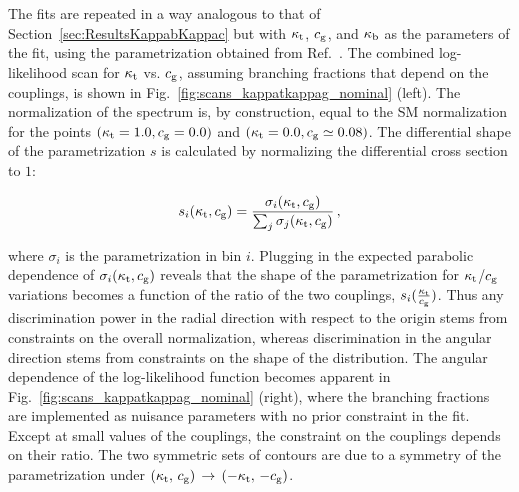 The fits are repeated in a way analogous to that of Section~\ref{sec:ResultsKappabKappac} but with $\kappa_{\mathrm{t}}$, $c_\mathrm{g}$, and $\kappa_{\mathrm{b}}$ as the parameters of the fit, using the parametrization obtained from Ref.~\cite{Grazzini:2017szg}.
% 
The combined log-likelihood scan for $\kappa_{\mathrm{t}}$ vs. $c_\mathrm{g}$, assuming branching fractions that depend on the couplings, is shown in Fig.~\ref{fig:scans_kappatkappag_nominal} (left).
% 
The normalization of the spectrum is, by construction, equal to the SM normalization for the points $( \kappa_{\mathrm{t}} = 1.0, c_\mathrm{g} = 0.0 )$ and $( \kappa_{\mathrm{t}} = 0.0, c_\mathrm{g} \simeq 0.08 )$.
% 
The differential shape of the parametrization $s$ is calculated by normalizing the differential cross section to $1$:
% 
\begin{linenomath*}
\begin{equation}
    s_i(\kappa_{\mathrm{t}}, c_\mathrm{g}) =
        \frac
            {\sigma_i(\kappa_{\mathrm{t}}, c_\mathrm{g})}
            {\sum_j \sigma_j(\kappa_{\mathrm{t}}, c_\mathrm{g})}
    \,,
\end{equation}
\end{linenomath*}
% 
where $\sigma_i$ is the parametrization in bin $i$.
% 
Plugging in the expected parabolic dependence of $\sigma_i(\kappa_{\mathrm{t}}, c_\mathrm{g})$
% 
reveals that the shape of the parametrization for $\kappa_{\mathrm{t}}$/$c_\mathrm{g}$ variations becomes a function of the ratio of the two couplings, $s_i(\frac{\kappa_{\mathrm{t}}}{c_\mathrm{g}})$.
% 
Thus any discrimination power in the radial direction with respect to the origin stems from constraints on the overall normalization, whereas discrimination in the angular direction stems from constraints on the shape of the distribution.
% 
The angular dependence of the log-likelihood function becomes apparent in Fig.~\ref{fig:scans_kappatkappag_nominal} (right), where the branching fractions are implemented as nuisance parameters with no prior constraint in the fit.
% 
Except at small values of the couplings, the constraint on the couplings depends on their ratio.
% 
The two symmetric sets of contours are due to a symmetry of the parametrization under $(\kappa_{\mathrm{t}},\,c_\mathrm{g}) \, \to \, (-\kappa_{\mathrm{t}},\,-c_\mathrm{g})$.


